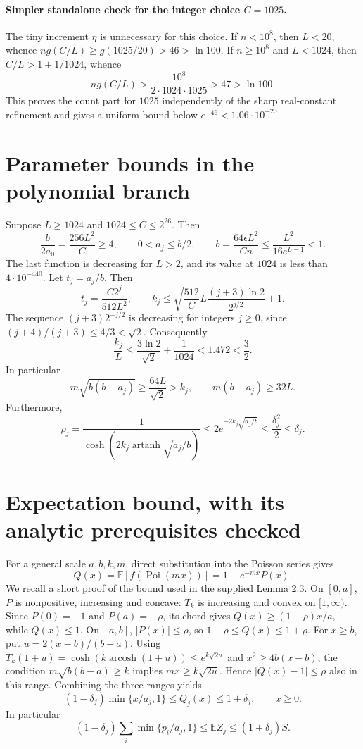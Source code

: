 \documentclass[11pt]{article}
\newcommand{\E}{\mathbb E}
\newcommand{\Poi}{\operatorname{Poi}}
\begin{document}
\paragraph{Simpler standalone check for the integer choice $C=1025$.}
The tiny increment $\eta$ is unnecessary for this choice. If $n<10^8$,
then $L<20$, whence $ng(C/L)\ge g(1025/20)>46>\ln100$.
If $n\ge10^8$ and $L<1024$, then $C/L>1+1/1024$, whence
\[
 ng(C/L)>\frac{10^8}{2\cdot1024\cdot1025}>47>\ln100.
\]
This proves the count part for $1025$ independently of the sharp real-constant
refinement and gives a uniform bound below $e^{-46}<1.06\cdot10^{-20}$.

\section{Parameter bounds in the polynomial branch}
Suppose $L\ge1024$ and $1024\le C\le2^{26}$. Then
\[
 \frac b{2a_0}=\frac{256L^2}{C}\ge4,
 \qquad 0<a_j\le b/2,\qquad
 b=\frac{64\epsilon L^2}{Cn}\le\frac{L^2}{16e^{L-1}}<1.
\]
The last function is decreasing for $L>2$, and its value at $1024$ is
less than $4\cdot10^{-440}$. Let $t_j=a_j/b$. Then
\[
 t_j=\frac{C2^j}{512L^2},\qquad
 k_j\le \sqrt{\frac{512}{C}}L\frac{(j+3)\ln2}{2^{j/2}}+1.
\]
The sequence $(j+3)2^{-j/2}$ is decreasing for integers $j\ge0$, since
$(j+4)/(j+3)\le4/3<\sqrt2$. Consequently
\begin{equation}
 \frac{k_j}{L}\le\frac{3\ln2}{\sqrt2}+\frac1{1024}
 <1.472<\frac32.\label{eq:degree}
\end{equation}
In particular
\[
 m\sqrt{b(b-a_j)}\ge\frac{64L}{\sqrt2}>k_j,
 \qquad m(b-a_j)\ge32L.
\]
Furthermore,
\[
 \rho_j=\frac1{\cosh(2k_j\operatorname{artanh}\sqrt{a_j/b})}
 \le2e^{-2k_j\sqrt{a_j/b}}
 \le\frac{\delta_j^2}{2}\le\delta_j.
\]

\section{Expectation bound, with its analytic prerequisites checked}
For a general scale $a,b,k,m$, direct substitution into the Poisson series
gives
\[
 Q(x)=\E[f(\Poi(mx))]=1+e^{-mx}P(x).
\]
We recall a short proof of the bound used in the supplied Lemma 2.3.
On $[0,a]$, $P$ is nonpositive, increasing and concave: $T_k$ is increasing
and convex on $[1,\infty)$. Since $P(0)=-1$ and $P(a)=-\rho$, its chord gives
$Q(x)\ge(1-\rho)x/a$, while $Q(x)\le1$. On $[a,b]$, $|P(x)|\le\rho$, so
$1-\rho\le Q(x)\le1+\rho$. For $x\ge b$, put $u=2(x-b)/(b-a)$.
Using $T_k(1+u)=\cosh(k\operatorname{arcosh}(1+u))\le e^{k\sqrt{2u}}$
and $x^2\ge4b(x-b)$, the condition $m\sqrt{b(b-a)}\ge k$ implies
$mx\ge k\sqrt{2u}$. Hence $|Q(x)-1|\le\rho$ also in this range.
Combining the three ranges yields
\begin{equation}
 (1-\delta_j)\min\{x/a_j,1\}\le Q_j(x)\le1+\delta_j,
 \qquad x\ge0.\label{eq:expectation}
\end{equation}
In particular
\[
 (1-\delta_j)\sum_i\min\{p_i/a_j,1\}\le\E Z_j\le(1+\delta_j)S.
\]
\end{document}
